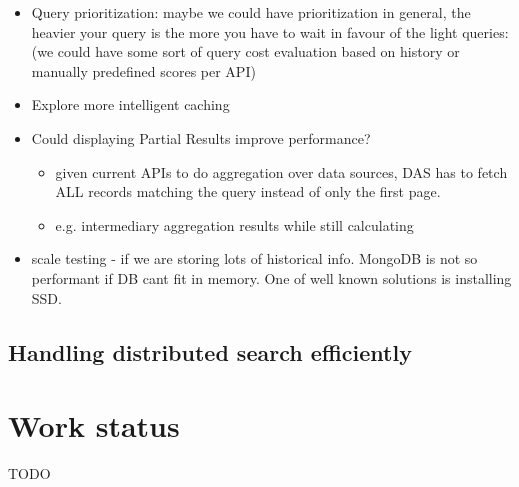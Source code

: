 \documentclass[a4paper,11pt,draft]{article}
\begin{document}
\begin{itemize}
	     					\item  Query prioritization: {\color{red}maybe we could have prioritization in general, the heavier your query is the more you have to wait in favour of  the light queries}: 
	     					(we could have some sort of query cost evaluation based on history or manually predefined scores per API)
	     					
                		\item Explore more intelligent caching
	                	  
	                		

					\item Could displaying Partial Results improve performance?
					\begin{itemize}
					     \item given current APIs to do aggregation over data sources, DAS has to fetch ALL records matching the query instead of only the first page.
                        \item {\color{red}e.g. intermediary aggregation results while still calculating}
                        
					\end{itemize}

                        
	                	 \item scale testing - if we are storing lots of historical info. MongoDB is not so performant if DB cant fit in memory. One of well known solutions is installing SSD.                        
\end{itemize}

\subsection{Handling distributed search efficiently}


\pagebreak



\pagebreak




\section{Work status}
TODO
\end{document}
